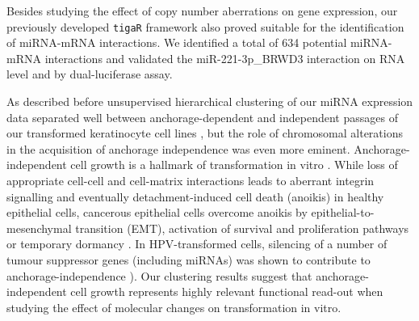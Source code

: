 Besides studying the effect of copy number aberrations on gene expression, our previously developed {\tt tigaR} framework also proved suitable for the identification of miRNA-mRNA interactions\cite{Miok2014}. We identified a total of 634 potential miRNA-mRNA interactions and validated the miR-221-3p\_BRWD3 interaction on RNA level and by dual-luciferase assay. 

As described before unsupervised hierarchical clustering of our miRNA expression data separated well between anchorage-dependent and independent passages of our transformed keratinocyte cell lines \cite{Wilting2016}, but the role of chromosomal alterations in the acquisition of anchorage independence was even more eminent. Anchorage-independent cell growth is a hallmark of transformation in vitro \cite{Freedman1974, Mori2009}. While loss of appropriate cell-cell and cell-matrix interactions leads to aberrant integrin signalling and eventually detachment-induced cell death (anoikis) in healthy epithelial cells, cancerous epithelial cells overcome anoikis by epithelial-to-mesenchymal transition (EMT), activation of survival and proliferation pathways or temporary dormancy \cite{Guadamillas2011}. In HPV-transformed cells, silencing of a number of tumour suppressor genes (including miRNAs) was shown to contribute to anchorage-independence \cite{Wilting2016, Khalifa2011, Mack2013, Overmeer2009, Razani2000, Steenbergen2004}). Our clustering results suggest that anchorage-independent cell growth represents highly relevant functional read-out when studying the effect of molecular changes on transformation in vitro.

